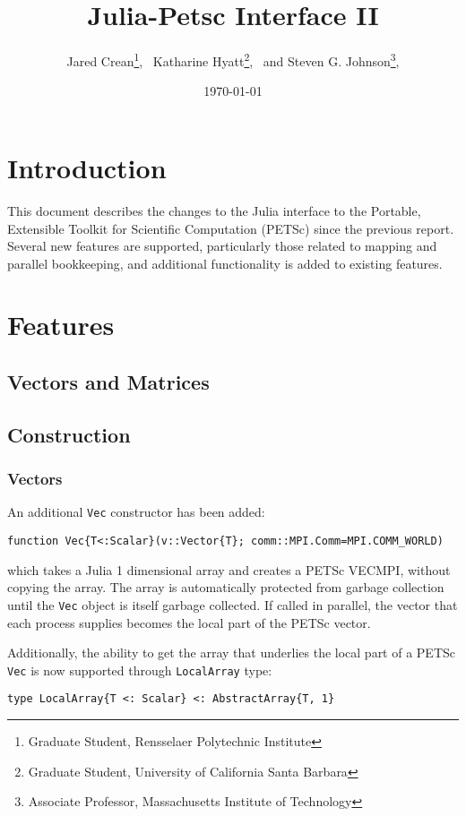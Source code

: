 \documentclass{article}
\title{Julia-Petsc Interface II}
\author{
  Jared Crean\thanks{Graduate Student, Rensselaer Polytechnic Institute}, \
  Katharine Hyatt\thanks{Graduate Student, University of California Santa Barbara}, \ and
  Steven G. Johnson\thanks{Associate Professor, Massachusetts Institute of Technology},
}
\date{\today}
\begin{document}
\maketitle

\section{Introduction} \label{sec:intro}
This document describes the changes to the Julia interface to the Portable, Extensible Toolkit for Scientific Computation (PETSc) since the previous report.
Several new features are supported, particularly those related to mapping 
and parallel bookkeeping, and additional functionality is added to existing
features.



\section{Features} \label{sec:features}

\subsection{Vectors and Matrices} \label{sec:arrays}
\subsection{Construction}
\subsubsection{Vectors}
An additional \texttt{Vec} constructor has been added:
\begin{verbatim}
function Vec{T<:Scalar}(v::Vector{T}; comm::MPI.Comm=MPI.COMM_WORLD)
\end{verbatim}
\noindent which takes a Julia 1 dimensional array and creates a PETSc VECMPI, without
copying the array.  The array is automatically protected from garbage 
collection until the \texttt{Vec} object is itself garbage collected.
If called in parallel, the vector that each process supplies becomes the local
part of the PETSc vector.

Additionally, the ability to get the array that underlies the local part of
a PETSc \texttt{Vec} is now supported through \texttt{LocalArray} type:

\begin{verbatim}
type LocalArray{T <: Scalar} <: AbstractArray{T, 1}
\end{verbatim}
\end{document}
